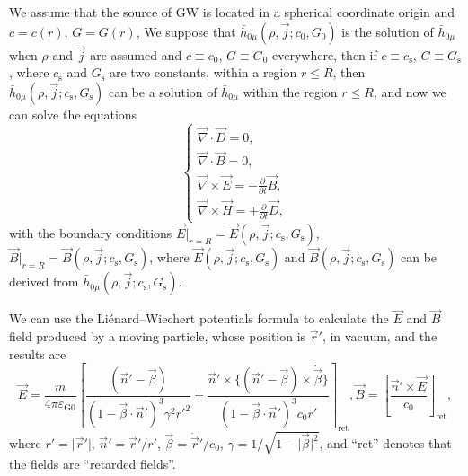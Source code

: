 \documentclass{article}
\def\p{\partial}
\begin{document}
We assume that the source of GW is located in a spherical coordinate origin and $c=c(r)$, $G=G(r)$, We suppose that $\bar{h}_{0 \mu}(\rho,\vec{j};c_0,G_0)$ is the solution of $\bar{h}_{0 \mu}$ when $\rho$ and $\vec{j}$ are assumed and $c\equiv c_0$, $G\equiv G_0$ everywhere, then if $c\equiv c_\text{s}$, $G\equiv G_\text{s}$, where $c_\text{s}$ and $G_\text{s}$ are two constants, within a region $r\leq R$, then $\bar{h}_{0 \mu}(\rho,\vec{j};c_\text{s},G_\text{s})$ can be a solution of $\bar{h}_{0 \mu}$ within the region $r\leq R$, and now we can solve the equations
\begin{equation}
    \begin{cases}
        \vec{\nabla}\cdot\vec{D}=0,\\
        \vec{\nabla}\cdot\vec{B}=0,\\
        \vec{\nabla}\times\vec{E}=-\frac{\p}{\p t}\vec{B},\\
        \vec{\nabla}\times\vec{H}=+\frac{\p}{\p t}\vec{D},
    \end{cases}
\end{equation}
with the boundary conditions $\vec{E}|_{r=R}=\vec{E}(\rho,\vec{j};c_\text{s},G_\text{s})$, $\vec{B}|_{r=R}=\vec{B}(\rho,\vec{j};c_\text{s},G_\text{s})$, where $\vec{E}(\rho,\vec{j};c_\text{s},G_\text{s})$ and $\vec{B}(\rho,\vec{j};c_\text{s},G_\text{s})$ can be derived from $\bar{h}_{0 \mu}(\rho,\vec{j};c_\text{s},G_\text{s})$.

We can use the Li\'enard--Wiechert potentials formula to calculate the $\vec{E}$ and $\vec{B}$ field produced by a moving particle, whose position is $\vec{r}'$, in vacuum, and the results are
\begin{equation}
    \vec{E}=\frac{m}{4 \pi \varepsilon_{\text{G}0}}\left[\frac{(\vec{n}'-\vec{\beta})}{(1-\vec{\beta} \cdot \vec{n}')^{3} \gamma^{2} {r'}^{2}}+\frac{\vec{n}' \times\{(\vec{n}'-\vec{\beta}) \times \dot{\vec{\beta}}\}}{(1-\vec{\beta} \cdot \vec{n}')^{3} c_0 r'}\right]_{\text{ret}},\vec{B}=\left[\frac{\vec{n}'\times \vec{E}}{c_0}\right]_{\text{ret}},
\end{equation}
where $r'=\lvert\vec{r}'\rvert$, $\vec{n}'=\vec{r}'/r'$, $\vec{\beta}=\dot{\vec{r}}'/c_0$, $\gamma=1/\sqrt{1-\lvert\vec{\beta}\rvert^2}$, and ``ret'' denotes that the fields are ``retarded fields''.
\end{document}
